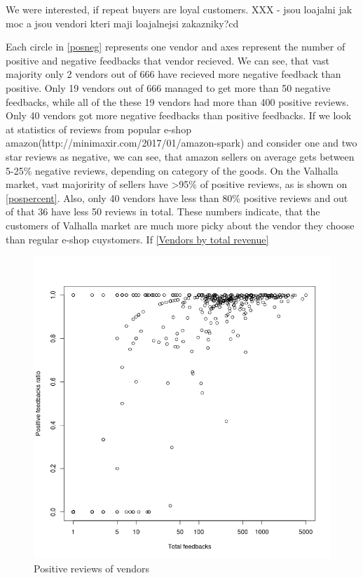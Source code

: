 \documentclass[
  digital, %
  table,   %
  lof,     %
  lot,     %
  oneside
]{fithesis3}
\begin{document}
We were interested, if repeat buyers are loyal customers.
XXX - jsou loajalni jak moc a jsou vendori kteri maji loajalnejsi zakazniky?cd 


Each circle in \ref{posneg} represents one vendor and axes represent
the number of positive and negative feedbacks that vendor recieved. 
We can see, that vast majority only 2 vendors out of 666 have recieved more
negative feedback than positive.
Only 19 vendors out of 666 managed to get more than 50 negative feedbacks,
while all of the these 19 vendors had more
 than 400 positive reviews.
Only 40 vendors got more negative feedbacks than positive feedbacks.
 If we look at statistics of reviews from popular e-shop amazon(http://minimaxir.com/2017/01/amazon-spark)
 and consider one and two star reviews as negative, we can see, that amazon sellers on
 average gets between 5-25\% negative reviews, depending on category of the goods.
 On the Valhalla market, vast majoririty of sellers have >95\% of positive reviews, as is shown on \ref{pospercent}.
 Also, only 40 vendors have less than 80\% positive reviews and out of that 36 have less 50 reviews in total.
 These numbers indicate, that the customers of Valhalla market
 are much more picky about the vendor they choose than regular e-shop cuystomers. If \ref{Vendors by total revenue}
  

\begin{figure}[!htb]
    \centering
    \includegraphics[scale=0.4]{posratxtotal}
    \caption{Positive reviews of vendors}
    \label{posratxtotal}
\end{figure}
\end{document}
